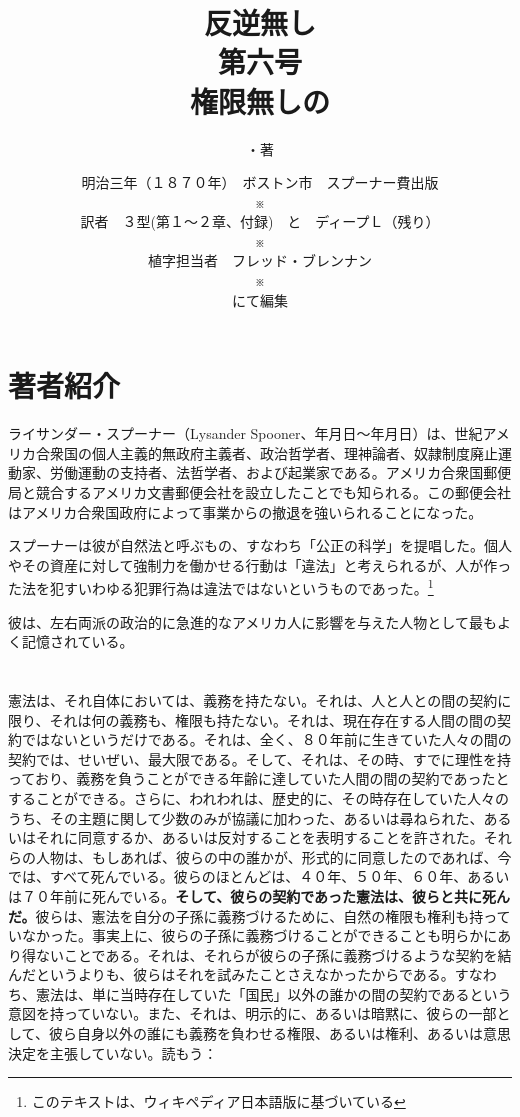 \documentclass[dvipdfmx, uplatex, tate, landscape]{utbook}
\title{{\bfseries 反逆無し}\\第六号\\{\bfseries 権限無しの\ruby{憲法}{|（米国の）}}\\\vspace{3em}\rensuji{\small(No Treason №6:}\rensuji{\small The Constitution of No Authority)}}
\author{\rensuji{\ruby{ライサンダー}{Lysander|||||}}・\rensuji{\ruby{スプーナー}{Spooner||||}}著}
\date{明治三年（１８７０年）　ボストン市　スプーナー費出版\\※\\訳者　\rensujiB{GPT}３型(第１〜２章、付録)　と　ディープＬ（残り）\\※\\植字担当者　フレッド・ブレンナン\\※\\\todayD{}にて編集}
\newcommand{\rensujiB}[1]{\rensuji{\resizebox{1.22zw}{0.66zw}{#1}}}
\begin{document}
\maketitle
\chapter*{著者紹介}

ライサンダー・スプーナー（Lysander Spooner、\rensujiB{1808}年月日〜\rensujiB{1887}年月日）は、世紀アメリカ合衆国の個人主義的無政府主義者、政治哲学者、理神論者、奴隷制度廃止運動家、労働運動の支持者、法哲学者、および起業家である。アメリカ合衆国郵便局と競合するアメリカ文書郵便会社を設立したことでも知られる。この郵便会社はアメリカ合衆国政府によって事業からの撤退を強いられることになった。

スプーナーは彼が自然法と呼ぶもの、すなわち「公正の科学」を提唱した。個人やその資産に対して強制力を働かせる行動は「違法」と考えられるが、人が作った法を犯すいわゆる犯罪行為は違法ではないというものであった。\footnote{このテキストは、ウィキペディア日本語版に基づいている}

\vspace{1em}

\begin{center}
{}
\end{center}
\vspace{1em}

彼は、左右両派の政治的に急進的なアメリカ人に影響を与えた人物として最もよく記憶されている。
\tableofcontents
\chapter{}
\noindent{}憲法は、それ自体においては、義務を持たない。それは、人と人との間の契約に限り、それは何の義務も、権限も持たない。それは、現在存在する人間の間の契約ではないというだけである。それは、全く、８０年前に生きていた人々の間の契約では、せいぜい、最大限である。そして、それは、その時、すでに理性を持っており、義務を負うことができる年齢に達していた人間の間の契約であったとすることができる。さらに、われわれは、歴史的に、その時存在していた人々のうち、その主題に関して少数のみが協議に加わった、あるいは尋ねられた、あるいはそれに同意するか、あるいは反対することを表明することを許された。それらの人物は、もしあれば、彼らの中の誰かが、形式的に同意したのであれば、今では、すべて死んでいる。彼らのほとんどは、４０年、５０年、６０年、あるいは７０年前に死んでいる。{\bfseries そして、彼らの契約であった憲法は、彼らと共に死んだ。}彼らは、憲法を自分の子孫に義務づけるために、自然の権限も権利も持っていなかった。事実上に、彼らの子孫に義務づけることができることも明らかにあり得ないことである。それは、それらが彼らの子孫に義務づけるような契約を結んだというよりも、彼らはそれを試みたことさえなかったからである。すなわち、憲法は、単に当時存在していた「国民」以外の誰かの間の契約であるという意図を持っていない。また、それは、明示的に、あるいは暗黙に、彼らの一部として、彼ら自身以外の誰にも義務を負わせる権限、あるいは権利、あるいは意思決定を主張していない。読もう：
\end{document}
